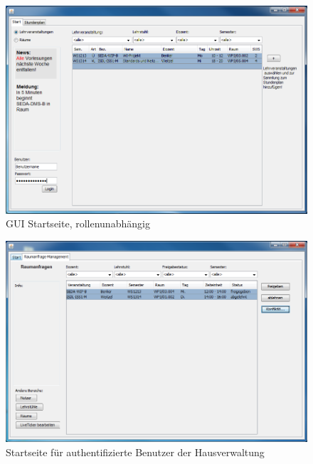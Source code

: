 \begin{figure}[H]
\begin{center}
\includegraphics[width=150mm]{images/section_7/HauptseiteAlle.PNG}
\caption{GUI Startseite, rollenunabhängig}
\label{img:hauptseite}
\end{center}
\end{figure}


\begin{figure}[H]
\begin{center}
\includegraphics[width=150mm]{images/section_7/VerwaltungHauptseite.PNG}
\caption{Startseite für authentifizierte Benutzer der Hausverwaltung}
\label{img:hauptseiteVerwaltung}
\end{center}
\end{figure}

